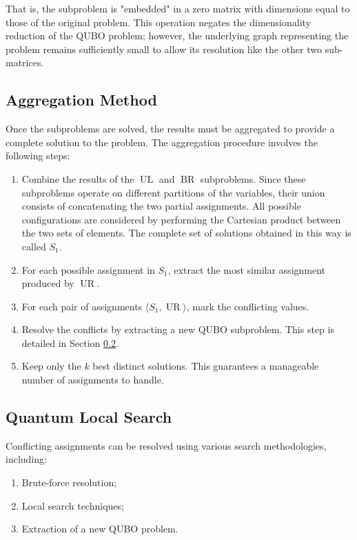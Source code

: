 That is, the subproblem is "embedded" in a zero matrix with dimensions equal to those of the original problem. 
This operation negates the dimensionality reduction of the QUBO problem; however, the underlying graph representing the problem remains sufficiently small to allow its resolution like the other two sub-matrices.

\subsection{Aggregation Method}\label{sec:aggr}

Once the subproblems are solved, the results must be aggregated to provide a complete solution to the problem.
The aggregation procedure involves the following steps: 
\begin{enumerate} 
	\item Combine the results of the $\operatorname{UL}$ and $\operatorname{BR}$ subproblems. Since these subproblems operate on different partitions of the variables, their union consists of concatenating the two partial assignments. 
    All possible configurations are considered by performing the Cartesian product between the two sets of elements. 
    The complete set of solutions obtained in this way is called $S_1$.
	\item For each possible assignment in $S_1$, extract the most similar assignment produced by $\operatorname{UR}$. 
    \item For each pair of assignments $\langle S_1,\operatorname{UR}\rangle$, mark the conflicting values. 
	\item Resolve the conflicts by extracting a new QUBO subproblem. This step is detailed in Section \ref{sec:qsearch}. 
	\item Keep only the $k$ best distinct solutions. This guarantees a manageable number of assignments to handle.
\end{enumerate}

\subsection{Quantum Local Search}\label{sec:qsearch}

Conflicting assignments can be resolved using various search methodologies, including: 
\begin{enumerate} 
	\item Brute-force resolution; 
	\item Local search techniques; 
	\item Extraction of a new QUBO problem. 
\end{enumerate}

